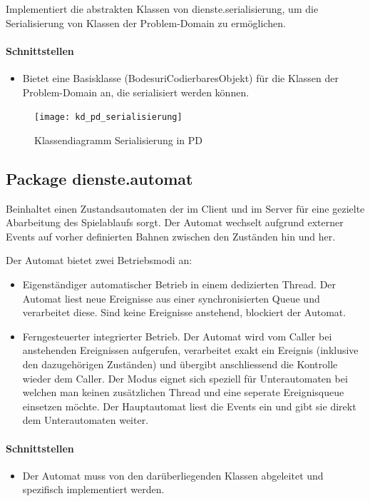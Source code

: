 \documentclass[12pt,halfparskip]{scrartcl}
\begin{document}
Implementiert die abstrakten Klassen von dienste.serialisierung, um die Serialisierung von Klassen der Problem-Domain zu ermöglichen.

\paragraph{Schnittstellen}
\begin{itemize}
	\item Bietet eine Basisklasse (BodesuriCodierbaresObjekt) für die Klassen der Problem-Domain an, die serialisiert werden können.
\end{itemize}

\begin{figure}[H]
	\centering
	\texttt{[image: kd\_pd\_serialisierung]}
	\caption{Klassendiagramm Serialisierung in PD}
	\label{fig:kd_pd_serialisierung}
\end{figure}


\clearpage
\subsection{Package dienste.automat}

Beinhaltet einen Zustandsautomaten der im Client und im Server für eine gezielte Abarbeitung des Spielablaufs sorgt. Der Automat wechselt aufgrund externer Events auf vorher definierten Bahnen zwischen den Zuständen hin und her.

Der Automat bietet zwei Betriebsmodi an:
\begin{itemize}
	\item Eigenständiger automatischer Betrieb in einem dedizierten Thread. Der Automat liest neue Ereignisse aus einer synchronisierten Queue und verarbeitet diese. Sind keine Ereignisse anstehend, blockiert der Automat.
	\item Ferngesteuerter integrierter Betrieb. Der Automat wird vom Caller bei anstehenden Ereignissen aufgerufen, verarbeitet exakt ein Ereignis (inklusive den dazugehörigen Zuständen) und übergibt anschliessend die Kontrolle wieder dem Caller. Der Modus eignet sich speziell für Unterautomaten bei welchen man keinen zusätzlichen Thread und eine seperate Ereignisqueue einsetzen möchte. Der Hauptautomat liest die Events ein und gibt sie direkt dem Unterautomaten weiter. 
\end{itemize}

\paragraph{Schnittstellen}
\begin{itemize}
	\item Der Automat muss von den darüberliegenden Klassen abgeleitet und spezifisch implementiert werden.
\end{itemize}	
\end{document}
